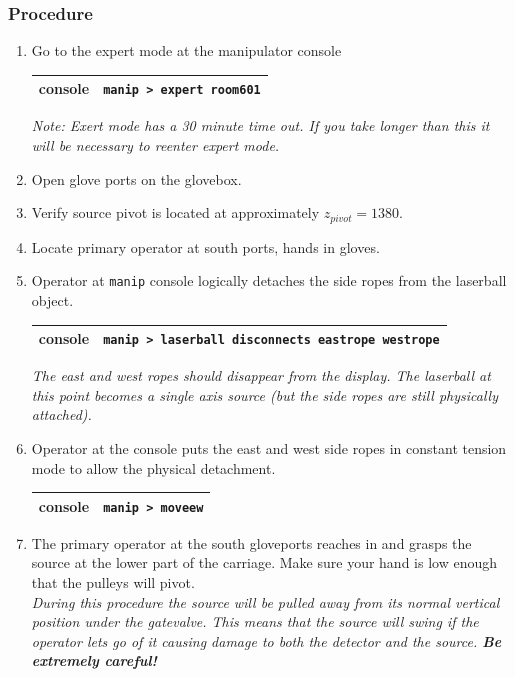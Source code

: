 \documentclass[11pt]{article}
\begin{document}
\subsubsection{Procedure}
\begin{enumerate}
\item \CheckBox[name=dsr1]{} Go to the expert mode at the manipulator console
\begin{center}
\begin{tabular}{|c|c|}
\hline
console & \verb+manip > expert room601+\\
\hline
\end{tabular}
\end{center}
{\it Note: Exert mode has a 30 minute time out. If you take longer than this it will be necessary to reenter expert mode.}
\item \CheckBox[name=dsr2]{} Open glove ports on the glovebox.
\item \CheckBox[name=dsr3]{} Verify source pivot is located at approximately $z_{pivot} = 1380$.
\item \CheckBox[name=dsr4]{} Locate primary operator at south ports, hands in gloves.
\item \CheckBox[name=dsr5]{} Operator at \verb+manip+ console logically detaches the side ropes from the laserball object.
\begin{center}
\begin{tabular}{|c|c|}
\hline
console & \verb+manip > laserball disconnects eastrope westrope+ \\
\hline
\end{tabular}
\end{center}
{\it The east and west ropes should disappear from the display. The laserball at this point becomes a single axis source (but the side ropes are still physically attached).}
\item \CheckBox[name=dsr6]{} Operator at the console puts the east and west side ropes in constant tension mode to allow the physical detachment.
\begin{center}
\begin{tabular}{|c|c|}
\hline
console & \verb+manip > moveew+\\
\hline
\end{tabular}
\end{center}
\item \CheckBox[name=dsr7]{} The primary operator at the south gloveports reaches in and grasps the source at the lower part of the carriage. Make sure your hand is low enough that the pulleys will pivot. \\ {\it During this procedure the source will be pulled away from its normal vertical position under the gatevalve. This means that the source will swing if the operator lets go of it causing damage to both the detector and the source. {\bf Be extremely careful!}}

\end{enumerate}
\end{document}
